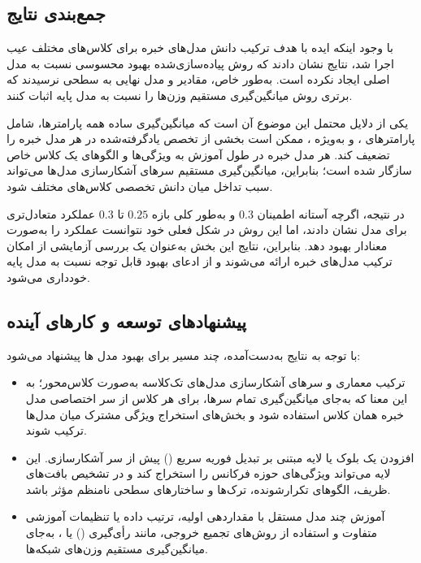 \documentclass[a4paper, 10pt, twocolumn]{article}
\begin{document}
	\subsection{جمع‌بندی نتایج }
	
	با وجود اینکه ایده  با هدف ترکیب دانش مدل‌های خبره برای
	کلاس‌های مختلف عیب اجرا شد، نتایج نشان دادند که روش پیاده‌سازی‌شده بهبود
	محسوسی نسبت به مدل اصلی  ایجاد نکرده است. به‌طور
	خاص، مقادیر  و  مدل نهایی به سطحی نرسیدند که
	برتری روش میانگین‌گیری مستقیم وزن‌ها را نسبت به مدل پایه اثبات کنند.
	
	یکی از دلایل محتمل این موضوع آن است که میانگین‌گیری ساده همه پارامترها،
	شامل پارامترهای ،  و به‌ویژه ،
	ممکن است بخشی از تخصص یادگرفته‌شده در هر مدل خبره را تضعیف کند. هر مدل
	خبره در طول آموزش به ویژگی‌ها و الگوهای یک کلاس خاص سازگار شده است؛
	بنابراین، میانگین‌گیری مستقیم سرهای آشکارسازی مدل‌ها می‌تواند سبب تداخل
	میان دانش تخصصی کلاس‌های مختلف شود.
	
	در نتیجه، اگرچه آستانه اطمینان \(0.3\) و به‌طور کلی بازه
	\(0.25\) تا \(0.3\) عملکرد متعادل‌تری برای مدل  نشان
	دادند، اما این روش در شکل فعلی خود نتوانست عملکرد 
	را به‌صورت معنادار بهبود دهد. بنابراین، نتایج این بخش به‌عنوان یک بررسی
	آزمایشی از امکان ترکیب مدل‌های خبره ارائه می‌شوند و از ادعای بهبود قابل
	توجه نسبت به مدل پایه خودداری می‌شود.
	
	
	\subsection{پیشنهادهای توسعه و کارهای آینده}
	
	با توجه به نتایج به‌دست‌آمده، چند مسیر برای بهبود مدل ها پیشنهاد می‌شود:
	
	\begin{itemize}
		
		
		\item ترکیب معماری و سرهای آشکارسازی مدل‌های تک‌کلاسه به‌صورت
		کلاس‌محور؛ به این معنا که به‌جای میانگین‌گیری تمام سرها، برای هر کلاس
		از سر اختصاصی مدل خبره همان کلاس استفاده شود و بخش‌های استخراج ویژگی
		مشترک میان مدل‌ها ترکیب شوند.
		
		\item افزودن یک بلوک یا لایه مبتنی بر تبدیل فوریه سریع () پیش
		از سر آشکارسازی. این لایه می‌تواند ویژگی‌های حوزه فرکانس را استخراج
		کند و در تشخیص بافت‌های ظریف، الگوهای تکرارشونده، ترک‌ها و ساختارهای
		سطحی نامنظم مؤثر باشد.
		
		\item آموزش چند مدل مستقل با مقداردهی اولیه، ترتیب داده یا تنظیمات
		آموزشی متفاوت و استفاده از روش‌های تجمیع خروجی، مانند رأی‌گیری
		() یا ، به‌جای میانگین‌گیری مستقیم
		وزن‌های شبکه‌ها.
	\end{itemize}
	
\end{document}
